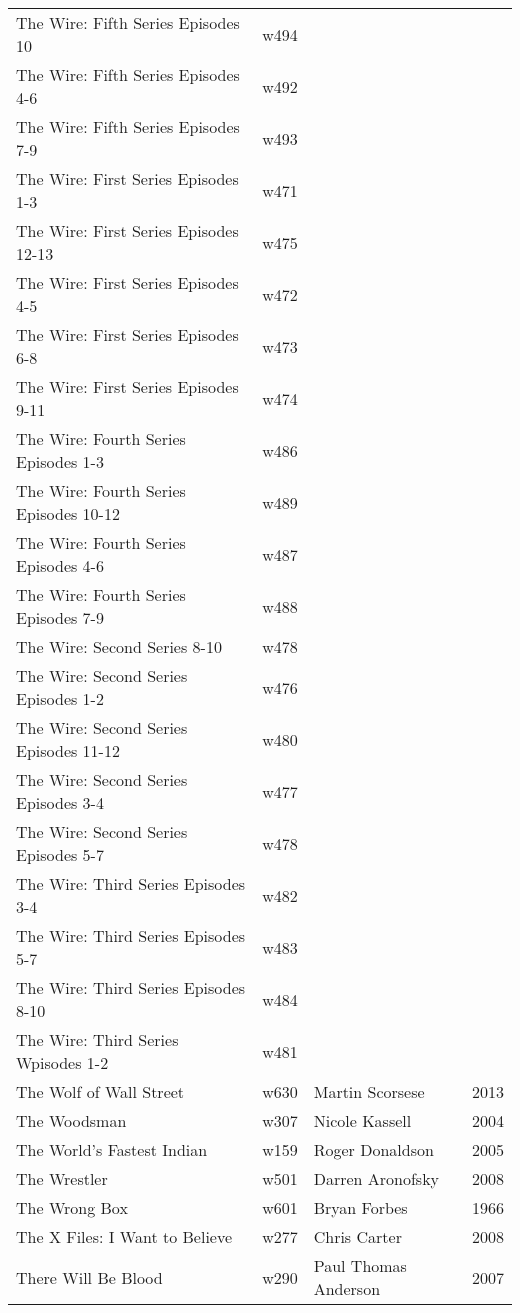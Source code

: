 \documentclass{article}
\begin{document}
\begin {center}
\begin{longtable}{p{10cm} l l l}
The Wire: Fifth Series Episodes 10 & w494 &  &  \\
The Wire: Fifth Series Episodes 4-6 & w492 &  &  \\
The Wire: Fifth Series Episodes 7-9 & w493 &  &  \\
The Wire: First Series Episodes 1-3 & w471 &  &  \\
The Wire: First Series Episodes 12-13 & w475 &  &  \\
The Wire: First Series Episodes 4-5 & w472 &  &  \\
The Wire: First Series Episodes 6-8 & w473 &  &  \\
The Wire: First Series Episodes 9-11 & w474 &  &  \\
The Wire: Fourth Series Episodes 1-3 & w486 &  &  \\
The Wire: Fourth Series Episodes 10-12 & w489 &  &  \\
The Wire: Fourth Series Episodes 4-6 & w487 &  &  \\
The Wire: Fourth Series Episodes 7-9 & w488 &  &  \\
The Wire: Second Series 8-10 & w478 &  &  \\
The Wire: Second Series Episodes 1-2 & w476 &  &  \\
The Wire: Second Series Episodes 11-12 & w480 &  &  \\
The Wire: Second Series Episodes 3-4 & w477 &  &  \\
The Wire: Second Series Episodes 5-7 & w478 &  &  \\
The Wire: Third Series Episodes 3-4 & w482 &  &  \\
The Wire: Third Series Episodes 5-7 & w483 &  &  \\
The Wire: Third Series Episodes 8-10 & w484 &  &  \\
The Wire: Third Series Wpisodes 1-2 & w481 &  &  \\
The Wolf of Wall Street & w630 & Martin Scorsese & 2013 \\
The Woodsman & w307 & Nicole Kassell & 2004 \\
The World's Fastest Indian & w159 & Roger Donaldson & 2005 \\
The Wrestler & w501 & Darren Aronofsky & 2008 \\
The Wrong Box & w601 & Bryan Forbes & 1966 \\
The X Files: I Want to Believe & w277 & Chris Carter & 2008 \\
There Will Be Blood & w290 & Paul Thomas Anderson & 2007 \\

\end{longtable}
\end{center}
\end{document}
